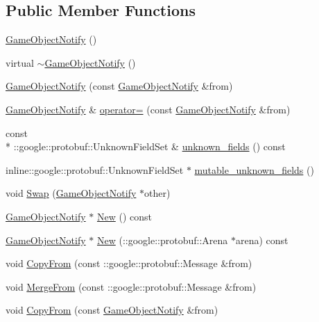 \subsection*{Public Member Functions}
\begin{DoxyCompactItemize}
\item 
\hyperlink{class_game_object_notify_a3e6824a087bec1744cfc9fba71fbc3f1}{Game\-Object\-Notify} ()
\item 
virtual \hyperlink{class_game_object_notify_ae85e7bbaea50075595a69c5d78bb2811}{$\sim$\-Game\-Object\-Notify} ()
\item 
\hyperlink{class_game_object_notify_af06e2a782b8a599555ba395d3dec804f}{Game\-Object\-Notify} (const \hyperlink{class_game_object_notify}{Game\-Object\-Notify} \&from)
\item 
\hyperlink{class_game_object_notify}{Game\-Object\-Notify} \& \hyperlink{class_game_object_notify_ab1951c4b4e75f13c67646b445d526863}{operator=} (const \hyperlink{class_game_object_notify}{Game\-Object\-Notify} \&from)
\item 
const \\*
\-::google\-::protobuf\-::\-Unknown\-Field\-Set \& \hyperlink{class_game_object_notify_a8d2d6ccfc91cd27a05fcc9e97534cc50}{unknown\-\_\-fields} () const 
\item 
inline\-::google\-::protobuf\-::\-Unknown\-Field\-Set $\ast$ \hyperlink{class_game_object_notify_aafb21632fce77e41d8b2e9cf723df223}{mutable\-\_\-unknown\-\_\-fields} ()
\item 
void \hyperlink{class_game_object_notify_ab4cd82478c332a44e03c65249a717ebb}{Swap} (\hyperlink{class_game_object_notify}{Game\-Object\-Notify} $\ast$other)
\item 
\hyperlink{class_game_object_notify}{Game\-Object\-Notify} $\ast$ \hyperlink{class_game_object_notify_ab6e37de74e40079ef7b30f0291b93220}{New} () const 
\item 
\hyperlink{class_game_object_notify}{Game\-Object\-Notify} $\ast$ \hyperlink{class_game_object_notify_a338c9aaf5767581cf0ccbe566a22cd03}{New} (\-::google\-::protobuf\-::\-Arena $\ast$arena) const 
\item 
void \hyperlink{class_game_object_notify_a45a598344fda5647816ed6bba5b94c95}{Copy\-From} (const \-::google\-::protobuf\-::\-Message \&from)
\item 
void \hyperlink{class_game_object_notify_af2604fb22741c6304ee689d8de537075}{Merge\-From} (const \-::google\-::protobuf\-::\-Message \&from)
\item 
void \hyperlink{class_game_object_notify_af163bd4f2834c44583ad22ff80c5fa34}{Copy\-From} (const \hyperlink{class_game_object_notify}{Game\-Object\-Notify} \&from)

\end{DoxyCompactItemize}
